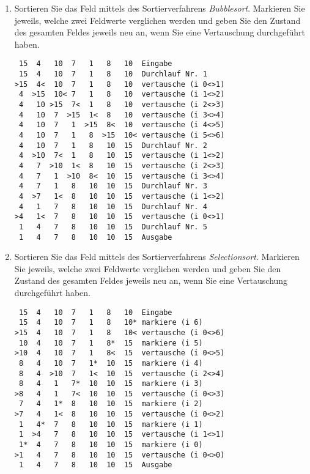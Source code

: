 \documentclass{bschlangaul-aufgabe}
\begin{document}
\begin{enumerate}


\item Sortieren Sie das Feld mittels des Sortierverfahrens
\emph{Bubblesort}. Markieren Sie jeweils, welche zwei Feldwerte
verglichen werden und geben Sie den Zustand des gesamten Feldes jeweils
neu an, wenn Sie eine Vertauschung durchgeführt haben.

\begin{bAntwort}
\begin{verbatim}
 15  4   10  7   1   8   10  Eingabe
 15  4   10  7   1   8   10  Durchlauf Nr. 1
>15  4<  10  7   1   8   10  vertausche (i 0<>1)
 4  >15  10< 7   1   8   10  vertausche (i 1<>2)
 4   10 >15  7<  1   8   10  vertausche (i 2<>3)
 4   10  7  >15  1<  8   10  vertausche (i 3<>4)
 4   10  7   1  >15  8<  10  vertausche (i 4<>5)
 4   10  7   1   8  >15  10< vertausche (i 5<>6)
 4   10  7   1   8   10  15  Durchlauf Nr. 2
 4  >10  7<  1   8   10  15  vertausche (i 1<>2)
 4   7  >10  1<  8   10  15  vertausche (i 2<>3)
 4   7   1  >10  8<  10  15  vertausche (i 3<>4)
 4   7   1   8   10  10  15  Durchlauf Nr. 3
 4  >7   1<  8   10  10  15  vertausche (i 1<>2)
 4   1   7   8   10  10  15  Durchlauf Nr. 4
>4   1<  7   8   10  10  15  vertausche (i 0<>1)
 1   4   7   8   10  10  15  Durchlauf Nr. 5
 1   4   7   8   10  10  15  Ausgabe
\end{verbatim}
\end{bAntwort}


\item Sortieren Sie das Feld mittels des Sortierverfahrens
\emph{Selectionsort}. Markieren Sie jeweils, welche zwei Feldwerte
verglichen werden und geben Sie den Zustand des gesamten Feldes jeweils
neu an, wenn Sie eine Vertauschung durchgeführt haben.

\begin{bAntwort}
\begin{verbatim}
 15  4   10  7   1   8   10  Eingabe
 15  4   10  7   1   8   10* markiere (i 6)
>15  4   10  7   1   8   10< vertausche (i 0<>6)
 10  4   10  7   1   8*  15  markiere (i 5)
>10  4   10  7   1   8<  15  vertausche (i 0<>5)
 8   4   10  7   1*  10  15  markiere (i 4)
 8   4  >10  7   1<  10  15  vertausche (i 2<>4)
 8   4   1   7*  10  10  15  markiere (i 3)
>8   4   1   7<  10  10  15  vertausche (i 0<>3)
 7   4   1*  8   10  10  15  markiere (i 2)
>7   4   1<  8   10  10  15  vertausche (i 0<>2)
 1   4*  7   8   10  10  15  markiere (i 1)
 1  >4   7   8   10  10  15  vertausche (i 1<>1)
 1*  4   7   8   10  10  15  markiere (i 0)
>1   4   7   8   10  10  15  vertausche (i 0<>0)
 1   4   7   8   10  10  15  Ausgabe
\end{verbatim}
\end{bAntwort}


\end{enumerate}
\end{document}

